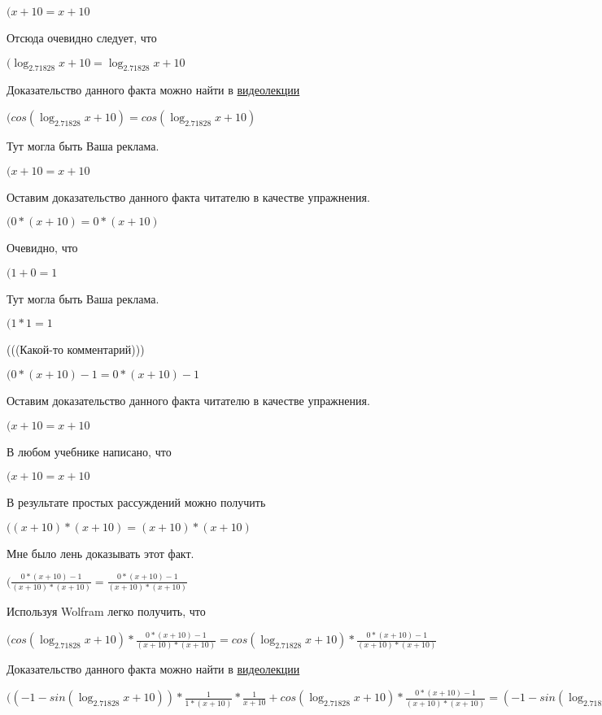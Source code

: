 \documentclass[12pt,a4paper,fleqn]{article}
\theoremstyle{definition}
\begin{document}
$( x  +  10  =  x  +  10 $

Отсюда очевидно следует, что

$(\log_{ 2.71828 }{ x  +  10 } = \log_{ 2.71828 }{ x  +  10 }$

Доказательство данного факта можно найти в \href{https://www.youtube.com/watch?v=dQw4w9WgXcQ}{видеолекции}

$(cos(\log_{ 2.71828 }{ x  +  10 }) = cos(\log_{ 2.71828 }{ x  +  10 })$

Тут могла быть Ваша реклама.

$( x  +  10  =  x  +  10 $

Оставим доказательство данного факта читателю в качестве упражнения.

$( 0  * ( x  +  10 ) =  0  * ( x  +  10 )$

Очевидно, что

$( 1  +  0  =  1 $

Тут могла быть Ваша реклама.

$( 1  *  1  =  1 $

(((Какой-то комментарий)))

$( 0  * ( x  +  10 ) -  1  =  0  * ( x  +  10 ) -  1 $

Оставим доказательство данного факта читателю в качестве упражнения.

$( x  +  10  =  x  +  10 $

В любом учебнике написано, что

$( x  +  10  =  x  +  10 $

В результате простых рассуждений можно получить

$(( x  +  10 ) * ( x  +  10 ) = ( x  +  10 ) * ( x  +  10 )$

Мне было лень доказывать этот факт.

$(\frac{ 0  * ( x  +  10 ) -  1 }{( x  +  10 ) * ( x  +  10 )}
 = \frac{ 0  * ( x  +  10 ) -  1 }{( x  +  10 ) * ( x  +  10 )}
$

Используя Wolfram легко получить, что

$(cos(\log_{ 2.71828 }{ x  +  10 }) * \frac{ 0  * ( x  +  10 ) -  1 }{( x  +  10 ) * ( x  +  10 )}
 = cos(\log_{ 2.71828 }{ x  +  10 }) * \frac{ 0  * ( x  +  10 ) -  1 }{( x  +  10 ) * ( x  +  10 )}
$

Доказательство данного факта можно найти в \href{https://www.youtube.com/watch?v=dQw4w9WgXcQ}{видеолекции}

$(( -1  - sin(\log_{ 2.71828 }{ x  +  10 })) * \frac{ 1 }{ 1  * ( x  +  10 )}
 * \frac{ 1 }{ x  +  10 }
 + cos(\log_{ 2.71828 }{ x  +  10 }) * \frac{ 0  * ( x  +  10 ) -  1 }{( x  +  10 ) * ( x  +  10 )}
 = ( -1  - sin(\log_{ 2.71828 }{ x  +  10 })) * \frac{ 1 }{ 1  * ( x  +  10 )}
 * \frac{ 1 }{ x  +  10 }
 + cos(\log_{ 2.71828 }{ x  +  10 }) * \frac{ 0  * ( x  +  10 ) -  1 }{( x  +  10 ) * ( x  +  10 )}
$
\end{document}
